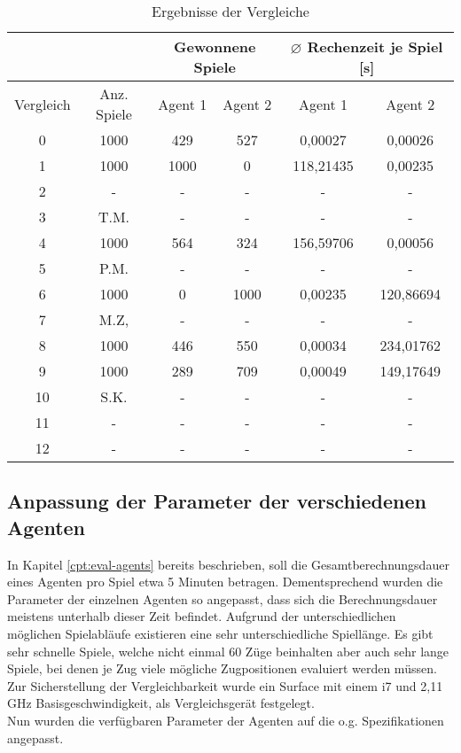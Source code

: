 \begin{table}[ht]
\begin{center}
\begin{tabular}{| c | c | c | c | c | c |} \hline
\multicolumn{2}{|c|}{}  & \multicolumn{2}{|c|}{Gewonnene Spiele} & \multicolumn{2}{|c|}{$\varnothing$ Rechenzeit je Spiel [s]} \\ \hline
Vergleich & Anz. Spiele & Agent 1 & Agent 2 & Agent 1 & Agent 2 \\ \hline
\hline
 0 & 1000 & 429  &  527 &   0,00027 &   0,00026 \\ \hline
 \hline
 1 & 1000 & 1000 &    0 & 118,21435 &   0,00235 \\ \hline
 2 & -    & -    & -    & -         & -         \\ \hline
 3 & T.M. & -    & -    & -         & -         \\ \hline
 4 & 1000 &  564 &  324 & 156,59706 &   0,00056 \\ \hline
 5 & P.M. & -    & -    & -         & -         \\ \hline
 \hline
 6 & 1000 &    0 & 1000 &   0,00235 & 120,86694 \\ \hline
 7 & M.Z, & -    & -    & -         & -         \\ \hline
 8 & 1000 &  446 &  550 &   0,00034 & 234,01762 \\ \hline
 9 & 1000 &  289 &  709 &   0,00049 & 149,17649 \\ \hline
10 & S.K. & -    & -    & -         & -         \\ \hline
\hline
11 & -    & -    & -    & -         & -         \\ \hline
12 & -    & -    & -    & -         & -         \\ \hline
\end{tabular}
\end{center}
\caption{Ergebnisse der Vergleiche}
\label{tbl:cmp-results}
\end{table}

\subsection{Anpassung der Parameter der verschiedenen Agenten}
In Kapitel \ref{cpt:eval-agents} bereits beschrieben, soll die Gesamtberechnungsdauer eines Agenten pro Spiel etwa 5 Minuten betragen. Dementsprechend wurden die Parameter der einzelnen Agenten so angepasst, dass sich die Berechnungsdauer meistens unterhalb dieser Zeit befindet. Aufgrund der unterschiedlichen möglichen Spielabläufe existieren eine sehr unterschiedliche Spiellänge. Es gibt sehr schnelle Spiele, welche nicht einmal 60 Züge beinhalten aber auch sehr lange Spiele, bei denen je Zug viele mögliche Zugpositionen evaluiert werden müssen. Zur Sicherstellung der Vergleichbarkeit wurde ein Surface mit einem i7 und 2,11 GHz Basisgeschwindigkeit, als Vergleichsgerät festgelegt. 
\\Nun wurden die verfügbaren Parameter der Agenten auf die o.g. Spezifikationen angepasst.

